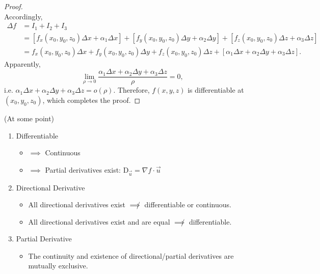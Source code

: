 \documentclass[11pt]{elegantbook}
\begin{document}
\begin{proof}
\[    \]
    Accordingly, 
    \begin{align*}
        \Delta f &= I_{1} + I_{2} + I_{3} \\
        &= \left[ f_{x}(x_{0},y_{0},z_{0})\Delta x + \alpha_{1}\Delta x \right] + \left[ f_{y}(x_{0},y_{0},z_{0})\Delta y + \alpha_{2}\Delta y \right] + \left[ f_{z}(x_{0},y_{0},z_{0})\Delta z + \alpha_{3}\Delta z \right] \\
        &= f_{x}(x_{0},y_{0},z_{0})\Delta x + f_{y}(x_{0},y_{0},z_{0})\Delta y + f_{z}(x_{0},y_{0},z_{0})\Delta z + \left[ \alpha_{1}\Delta x + \alpha_{2}\Delta y + \alpha_{3}\Delta z \right].
    \end{align*}
    Apparently, 
    \[
        \lim_{\rho \to 0} \frac{\alpha_{1}\Delta x + \alpha_{2}\Delta y + \alpha_{3}\Delta z}{\rho} = 0,
    \]
    i.e. \(\alpha_{1}\Delta x + \alpha_{2}\Delta y + \alpha_{3}\Delta z = o(\rho)\). 
    Therefore, \(f(x,y,z)\) is differentiable at \((x_{0},y_{0},z_{0})\), which completes the proof.
\end{proof}

\begin{note}{(At some point)}
    \begin{enumerate}
        \item  Differentiable
            \begin{itemize}
                \item \(\implies\) Continuous
                \item \(\implies\) Partial derivatives exist: \(\mathrm{D}_{\vec{u}}=\nabla f\cdot\vec{u}\)
            \end{itemize}
        \item  Directional Derivative
            \begin{itemize}
                \item All directional derivatives exist \(\not\implies\) differentiable or continuous.
                \item All directional derivatives exist and are equal \(\not\implies\) differentiable.
            \end{itemize}
        \item  Partial Derivative
        \begin{itemize}
            \item  The continuity and existence of directional/partial derivatives are mutually exclusive.
        \end{itemize}
    \end{enumerate}
\end{note}
\end{document}
